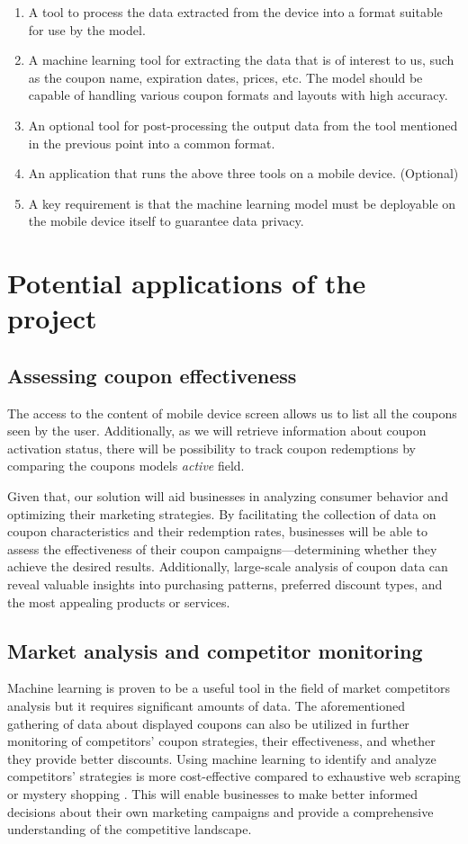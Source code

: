 \documentclass[licencjacka,en]{pracamgr}
\begin{document}
\begin{enumerate}
    \item A tool to process the data extracted from the device into a format suitable for use by the model.
    \item A machine learning tool for extracting the data that is of interest to us, such as the coupon name, expiration dates, prices, etc. The model should be capable of handling various coupon formats and layouts with high accuracy.
    \item An optional tool for post-processing the output data from the tool mentioned in the previous point into a common format.
    \item An application that runs the above three tools on a mobile device. (Optional)
    \item A key requirement is that the machine learning model must be deployable on the mobile device itself to guarantee data privacy.
\end{enumerate}

\section{Potential applications of the project}
\subsection{Assessing coupon effectiveness}
The access to the content of mobile device screen allows us to list all the coupons seen by the user. Additionally, as we will retrieve information about coupon activation status, there will be possibility to track coupon redemptions by comparing the coupons models \textit{active} field.

Given that, our solution will aid businesses in analyzing consumer behavior and optimizing their marketing strategies. By facilitating the collection of data on coupon characteristics and their redemption rates, businesses will be able to assess the effectiveness of their coupon campaigns—determining whether they achieve the desired results. Additionally, large-scale analysis of coupon data can reveal valuable insights into purchasing patterns, preferred discount types, and the most appealing products or services.

\subsection{Market analysis and competitor monitoring}
Machine learning is proven to be a useful tool in the field of market competitors analysis but it requires significant amounts of data\cite{competitor_tariffs}.
The aforementioned gathering of data about displayed coupons can also be utilized in further monitoring of competitors' coupon strategies, their effectiveness, and whether they provide better discounts. Using machine learning to identify and analyze competitors' strategies is more cost-effective compared to exhaustive web scraping or mystery shopping \cite{competitor_tariffs}. This will enable businesses to make better informed decisions about their own marketing campaigns and provide a comprehensive understanding of the competitive landscape.
\end{document}
